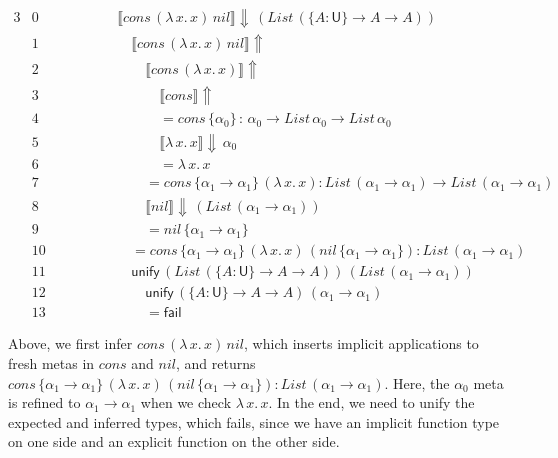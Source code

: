 \documentclass[acmsmall,review,anonymous,prologue,dvipsnames]{acmart}\settopmatter{printfolios=true,printccs=false,printacmref=false}
\renewcommand{\U}{\mathsf{U}}
\newcommand{\unify}{\mathsf{unify}}
\newcommand{\fail}{\mathsf{fail}}
\newcommand{\mi}[1]{\mathit{#1}}
\newcommand{\echeckt}[2]{\llbracket#1\rrbracket\!\Downarrow\,#2}
\newcommand{\einfert}[1]{\llbracket#1\rrbracket\!\Uparrow}
\theoremstyle{remark}
\begin{document}
\begin{alignat*}{3}
  & \scriptstyle{0 }\qquad\qquad && \echeckt{cons\,(\lambda\,x.\,x)\,\mi{nil}}{(\mi{List}\,(\{A : \U\}\to A \to A))}
     \hspace{14em}\\
  & \scriptstyle{1 }  && \quad \einfert{\mi{cons}\,(\lambda\,x.\,x)\,\mi{nil}} \\
  & \scriptstyle{2 }  && \qquad \einfert{\mi{cons}\,(\lambda\,x.\,x)}\\
  & \scriptstyle{3 }  && \qquad\quad \einfert{\mi{cons}}\\
  & \scriptstyle{4 }  && \qquad\quad = \mi{cons}\,\{\alpha_0\}\,:\,\alpha_0 \to \mi{List}\,\alpha_0 \to \mi{List}\,\alpha_0\\
  & \scriptstyle{5 }  && \qquad\quad \echeckt{\lambda\,x.\,x}{\alpha_0}\\
  & \scriptstyle{6 }  && \qquad\quad = \lambda\,x.\,x\\
  & \scriptstyle{7 }  && \qquad = \mi{cons}\,\{\alpha_1 \to \alpha_1\}\,(\lambda\,x.\,x) : \mi{List}\,(\alpha_1\to\alpha_1) \to \mi{List}\,(\alpha_1\to\alpha_1)\\
  & \scriptstyle{8 }  && \qquad \echeckt{\mi{nil}}{(\mi{List}\,(\alpha_1\to\alpha_1))}\\
  & \scriptstyle{9 }  && \qquad = \mi{nil}\,\{\alpha_1\to\alpha_1\}\\
  & \scriptstyle{10} && \quad = \mi{cons}\,\{\alpha_1 \to \alpha_1\}\,(\lambda\,x.\,x)\,(\mi{nil}\,\{\alpha_1\to\alpha_1\}): \mi{List}\,(\alpha_1\to\alpha_1)\\
  & \scriptstyle{11} && \quad \unify\,(\mi{List}\,(\{A : \U\}\to A \to A))\,(\mi{List}\,(\alpha_1\to\alpha_1))\\
  & \scriptstyle{12} && \qquad \unify\,(\{A : \U\}\to A \to A)\,(\alpha_1\to\alpha_1)\\
  & \scriptstyle{13} && \qquad = \fail
\end{alignat*}

Above, we first infer $\mi{cons}\,(\lambda\,x.\,x)\,\mi{nil}$, which inserts implicit
applications to fresh metas in $cons$ and $nil$, and returns $cons\,\{\alpha_1
\to \alpha_1\}\,(\lambda\,x.\,x)\,(\mi{nil}\,\{\alpha_1\to\alpha_1\}) :
\mi{List}\,(\alpha_1\to\alpha_1)$. Here, the $\alpha_0$ meta is refined to $\alpha_1
\to \alpha_1$ when we check $\lambda\,x.\,x$. In the end, we need to unify the
expected and inferred types, which fails, since we have an implicit function
type on one side and an explicit function on the other side.
\end{document}
